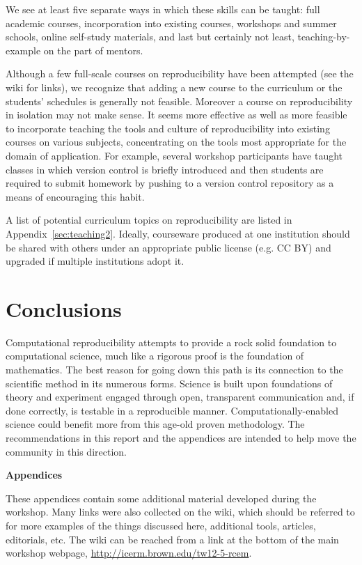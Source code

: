 \documentclass[11pt]{article}
\begin{document}
We see at least five separate ways in which these skills can be
taught: full academic courses, incorporation into existing
courses, workshops and summer schools, online self-study materials, and last
but certainly not least, teaching-by-example on the part of mentors. 

Although a few full-scale courses on reproducibility have been attempted
(see the wiki for links), we
recognize that adding a new course to the curriculum or the students'
schedules is generally not feasible.  Moreover a course on reproducibility
in isolation may not make sense.  It seems more effective as well as more
feasible to incorporate teaching the tools and culture of reproducibility
into existing courses on various subjects, concentrating on the tools most
appropriate for the domain of application.  For example, several workshop
participants have taught classes in which version control is briefly
introduced and then students are required to submit homework by pushing to a
version control repository as a means of encouraging this habit.

A list of potential curriculum topics on reproducibility are listed in 
Appendix~\ref{sec:teaching2}.
Ideally, courseware produced at one institution should be shared with others
under an appropriate public license (e.g. CC BY) and upgraded if multiple
institutions adopt it. 

\section{Conclusions} \label{sec:conclusions}

Computational reproducibility attempts to provide a rock solid foundation to
computational science, much like a rigorous proof is the foundation of
mathematics.  The best reason for going down this path is its connection to
the scientific method in its numerous forms.  Science is built upon
foundations of theory and experiment engaged through open, transparent
communication and, if done correctly, is testable in a
reproducible manner.  Computationally-enabled
science could benefit more from this age-old proven methodology.  
The recommendations in this report and the appendices are intended to help
move the community in this direction.





\clearpage
\appendix
\centerline{\Large\bf Appendices}
\vskip 10pt

These appendices contain some additional material developed during the
workshop.  Many links were also collected on the wiki, which should be
referred to for more examples of the things discussed here, additional
tools, articles, editorials, etc.  The wiki can be reached from a link at
the bottom of the main workshop webpage, 
\url{http://icerm.brown.edu/tw12-5-rcem}.
\end{document}
